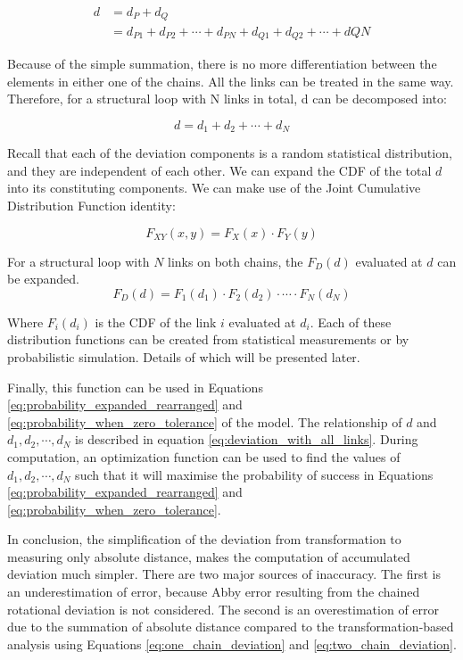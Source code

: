 \begin{align} \label{eq:deviation_with_two_links}
    d &= d_P + d_Q \nonumber\\
      &= d_{P1} + d_{P2} + \cdots + d_{PN} + d_{Q1} + d_{Q2} + \cdots + dQN 
\end{align}

Because of the simple summation, there is no more differentiation between the elements in either one of the chains. All the links can be treated in the same way. Therefore, for a structural loop with N links in total, d can be decomposed into:

\begin{equation} \label{eq:deviation_with_all_links}
    d = d_1 + d_2 + \cdots + d_N
\end{equation}

Recall that each of the deviation components is a random statistical distribution, and they are independent of each other. We can expand the CDF of the total $d$ into its constituting components. We can make use of the Joint Cumulative Distribution Function identity:

\begin{equation}
    F_{XY}(x,y) = F_X(x) \cdot F_Y(y)
\end{equation}

For a structural loop with $N$ links on both chains, the $F_D(d)$ evaluated at $d$ can be expanded. 
\begin{equation}  \label{eq:probability_with_all_links}
    F_D(d) = F_1(d_1) \cdot F_2(d_2) \cdot \cdots \cdot F_N(d_N)
\end{equation}

Where $F_i(d_i)$ is the CDF of the link $i$ evaluated at $d_i$. Each of these distribution functions can be created from statistical measurements or by probabilistic simulation. Details of which will be presented later.

Finally, this function can be used in Equations \ref{eq:probability_expanded_rearranged} and \ref{eq:probability_when_zero_tolerance} of the model. The relationship of $d$ and $d_1, d_2, \cdots , d_N$ is described in equation \ref{eq:deviation_with_all_links}. During computation, an optimization function can be used to find the values of $d_1, d_2, \cdots , d_N$ such that it will maximise the probability of success in Equations \ref{eq:probability_expanded_rearranged} and \ref{eq:probability_when_zero_tolerance}.

In conclusion, the simplification of the deviation from transformation to measuring only absolute distance, makes the computation of accumulated deviation much simpler. There are two major sources of inaccuracy. The first is an underestimation of error, because Abby error resulting from the chained rotational deviation is not considered. The second is an overestimation of error due to the summation of absolute distance compared to the transformation-based analysis using Equations \ref{eq:one_chain_deviation} and \ref{eq:two_chain_deviation}.

